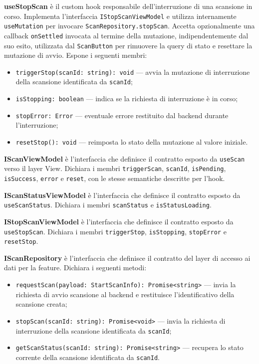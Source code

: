 \documentclass[a4paper, 11pt]{article}
\newcounter{subsubsubsection}[subsubsection]
\newcounter{subsubsubsubsection}[subsubsubsection]
\begin{document}
\textbf{useStopScan} è il custom hook responsabile dell'interruzione di una scansione in corso.
Implementa l'interfaccia \texttt{IStopScanViewModel} e utilizza internamente \texttt{useMutation}
per invocare \texttt{ScanRepository.stopScan}. Accetta opzionalmente una callback
\texttt{onSettled} invocata al termine della mutazione, indipendentemente dal suo esito, utilizzata
dal \texttt{ScanButton} per rimuovere la query di stato e resettare la mutazione di avvio. Espone
i seguenti membri:
\begin{itemize}
  \item \texttt{triggerStop(scanId: string): void} — avvia la mutazione di interruzione della
        scansione identificata da \texttt{scanId};
  \item \texttt{isStopping: boolean} — indica se la richiesta di interruzione è in corso;
  \item \texttt{stopError: Error} — eventuale errore restituito dal backend durante
        l'interruzione;
  \item \texttt{resetStop(): void} — reimposta lo stato della mutazione al valore iniziale.
\end{itemize}

\textbf{IScanViewModel} è l'interfaccia che definisce il contratto esposto da \texttt{useScan}
verso il layer View. Dichiara i membri \texttt{triggerScan}, \texttt{scanId}, \texttt{isPending},
\texttt{isSuccess}, \texttt{error} e \texttt{reset}, con le stesse semantiche descritte per
l'hook.

\textbf{IScanStatusViewModel} è l'interfaccia che definisce il contratto esposto da
\texttt{useScanStatus}. Dichiara i membri \texttt{scanStatus} e \texttt{isStatusLoading}.

\textbf{IStopScanViewModel} è l'interfaccia che definisce il contratto esposto da
\texttt{useStopScan}. Dichiara i membri \texttt{triggerStop}, \texttt{isStopping},
\texttt{stopError} e \texttt{resetStop}.


\textbf{IScanRepository} è l'interfaccia che definisce il contratto del layer di accesso ai dati
per la feature. Dichiara i seguenti metodi:
\begin{itemize}
  \item \texttt{requestScan(payload: StartScanInfo): Promise<string>} — invia la richiesta di
        avvio scansione al backend e restituisce l'identificativo della scansione creata;
  \item \texttt{stopScan(scanId: string): Promise<void>} — invia la richiesta di interruzione
        della scansione identificata da \texttt{scanId};
  \item \texttt{getScanStatus(scanId: string): Promise<string>} — recupera lo stato corrente
        della scansione identificata da \texttt{scanId}.
\end{itemize}
\end{document}
